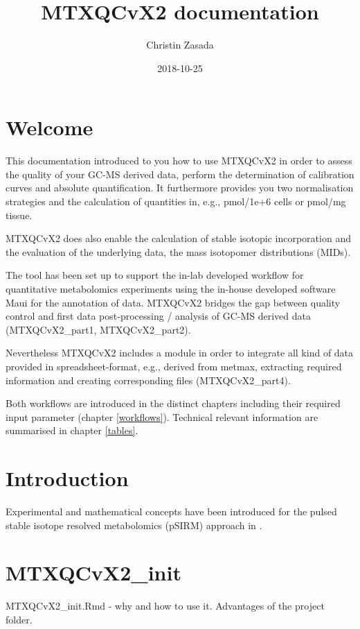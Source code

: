 \documentclass[]{book}
\title{MTXQCvX2 documentation}
\author{Christin Zasada}
\date{2018-10-25}
\theoremstyle{definition}
\theoremstyle{definition}
\theoremstyle{definition}
\theoremstyle{remark}
\begin{document}
\maketitle

{
\setcounter{tocdepth}{1}
\tableofcontents
}
\chapter{Welcome}\label{welcome}

This documentation introduced to you how to use MTXQCvX2 in order to
assess the quality of your GC-MS derived data, perform the determination
of calibration curves and absolute quantification. It furthermore
provides you two normalisation strategies and the calculation of
quantities in, e.g., pmol/1e+6 cells or pmol/mg tissue.

MTXQCvX2 does also enable the calculation of stable isotopic
incorporation and the evaluation of the underlying data, the mass
isotopomer distributions (MIDs).

The tool has been set up to support the in-lab developed workflow for
quantitative metabolomics experiments using the in-house developed
software Maui for the annotation of data. MTXQCvX2 bridges the gap
between quality control and first data post-processing / analysis of
GC-MS derived data (MTXQCvX2\_part1, MTXQCvX2\_part2).

Nevertheless MTXQCvX2 includes a module in order to integrate all kind
of data provided in spreadsheet-format, e.g., derived from metmax,
extracting required information and creating corresponding files
(MTXQCvX2\_part4).

Both workflows are introduced in the distinct chapters including their
required input parameter (chapter \ref{workflows}). Technical relevant
information are summarised in chapter \ref{tables}.

\chapter{Introduction}\label{intro}

Experimental and mathematical concepts have been introduced for the
pulsed stable isotope resolved metabolomics (pSIRM) approach in
\citep{Pietzke2014}.

\chapter{MTXQCvX2\_init}\label{init}

MTXQCvX2\_init.Rmd - why and how to use it. Advantages of the project
folder.
\end{document}
